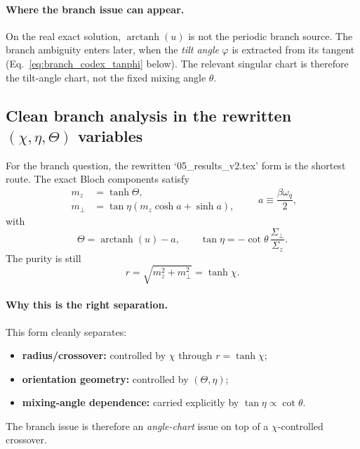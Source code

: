 \paragraph{Where the branch issue can appear.}
On the real exact solution, $\operatorname{arctanh}(u)$ is not the periodic
branch source.  The branch ambiguity enters later, when the \emph{tilt angle}
$\varphi$ is extracted from its tangent (Eq.~\eqref{eq:branch_codex_tanphi}
below).  The relevant singular chart is therefore the tilt-angle chart, not the
fixed mixing angle $\theta$.

\subsection{Clean branch analysis in the rewritten \texorpdfstring{$(\chi,\eta,\Theta)$}{(chi,eta,Theta)} variables}

For the branch question, the rewritten `05\_results\_v2.tex' form is the
shortest route.  The exact Bloch components satisfy
\begin{equation}
    \begin{split}
        m_z &= \tanh\Theta,\\
        m_\perp &= \tan\eta\left(m_z\cosh a + \sinh a\right),
    \end{split}
    \qquad a \equiv \frac{\beta\omega_q}{2},
    \label{eq:branch_codex_bloch_locking_linear}
\end{equation}
with
\begin{equation}
    \Theta = \operatorname{arctanh}(u)-a,
    \qquad
    \tan\eta = -\cot\theta\,\frac{\Sigma_\perp}{\Sigma_z}.
    \label{eq:branch_codex_theta_eta_params}
\end{equation}
The purity is still
\begin{equation}
    r = \sqrt{m_z^2+m_\perp^2} = \tanh\chi.
    \label{eq:branch_codex_purity_rewritten}
\end{equation}

\paragraph{Why this is the right separation.}
This form cleanly separates:
\begin{itemize}
    \item \textbf{radius/crossover:} controlled by $\chi$ through $r=\tanh\chi$;
    \item \textbf{orientation geometry:} controlled by $(\Theta,\eta)$;
    \item \textbf{mixing-angle dependence:} carried explicitly by
    $\tan\eta \propto \cot\theta$.
\end{itemize}
The branch issue is therefore an \emph{angle-chart} issue on top of a
$\chi$-controlled crossover.

